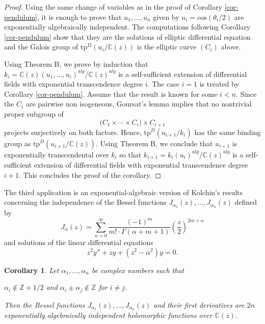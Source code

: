 \documentclass[12pt]{amsart}
\theoremstyle{definition}
\theoremstyle{plain}
\newtheorem{cor}[defn]{Corollary}
\theoremstyle{exampstyle}\newtheorem{thmx}{Theorem}
\theoremstyle{exampstyle}\newtheorem{thmxbis}{Theorem}
\begin{document}
\begin{proof} 
Using the same change of variables as in the proof of Corollary \ref{cor-pendulum}, it is enough to prove that $u_1,\ldots,u_n$ given by $u_i = \mathrm{cos}(\theta_i/2)$ are exponentially algebraically independent. The computations following Corollary \ref{cor-pendulum} show that  they are the solutions of elliptic differential equation and the Galois group of $\mathrm{tp}^D(u_i/\mathbb{C}(z))$ is the elliptic curve $(C_i)$ above. 

Using Theorem B, we prove by induction that $k_i = \mathbb{C}(z)(u_1,\ldots,u_i)^{alg}/\mathbb{C}(z)^{alg}$ is a self-sufficient extension of differential fields with exponential transcendence degree $i$. The case $i = 1$ is treated by Corollary \ref{cor-pendulum}. Assume that the result is known for some $i <  n$. Since the $C_i$ are pairwise non isogeneous, Goursat's lemma implies that no nontrivial proper subgroup of
$$ \Big( C_1 \times \cdots \times C_i \Big) \times C_{i + 1} $$ 
projects surjectively on both factors. Hence, $\mathrm{tp}^D(u_{i+1}/k_i)$ has the same binding group as $\mathrm{tp}^D(u_{i+1}/\mathbb{C}(z))$. Using Theorem B, we conclude that $u_{i + 1}$ is exponentially transcendental over $k_i$ so that $k_{i + 1} = k_i(u_i)^{alg}/\mathbb{C}(z)^{alg}$ is a self-sufficient extension of differential fields with exponential transcendence degree $i  + 1$. This concludes the proof of the corollary.
\end{proof} 


The third application is an exponential-algebraic version of Kolchin's results \cite{Kolchin} concerning the independence of the Bessel functions
$J_{\alpha_1}(z), \ldots, J_{\alpha_n}(z)$
defined by $$J_\alpha(z) = \sum_{n = 0}^\infty \frac{(-1)^m}{m! \cdot \Gamma(\alpha + m + 1)} (\frac{z}{2})^{2m+ \alpha} $$
and solutions of the linear differential equations \begin{equation}\label{equation-Bessel}  z^2y'' + zy +(z^2 - \alpha^2)y = 0.
\end{equation}
\begin{cor} \label{cor-Bessel}
Let $\alpha_1,\ldots, \alpha_n$ be complex numbers such that 
\begin{center} 
$\alpha_i \notin \mathbb{Z} + 1/2$ and $\alpha_i \pm \alpha_j \notin \mathbb{Z}$ for $i \neq j$. 
\end{center} 
Then the Bessel functions $J_{\alpha_1}(z), \ldots, J_{\alpha_n}(z)$
 and their first derivatives are $2n$ {\em exponentially algebraically independent} holomorphic functions over $\mathbb{C}(z)$. 
\end{cor} 
\end{document}
